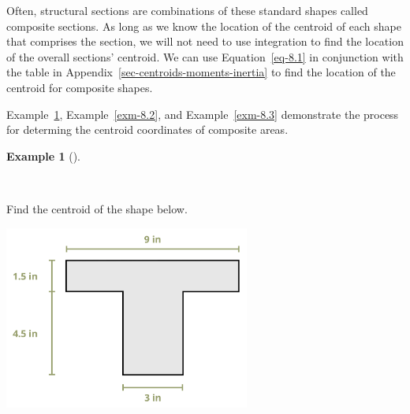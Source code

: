 \documentclass[
  letterpaper,
  DIV=11,
  numbers=noendperiod]{scrreprt}
\theoremstyle{definition}
\newtheorem{example}{Example}[chapter]
\theoremstyle{remark}
\begin{document}
Often, structural sections are combinations of these standard shapes
called composite sections. As long as we know the location of the
centroid of each shape that comprises the section, we will not need to
use integration to find the location of the overall sections' centroid.
We can use Equation~\ref{eq-8.1} in conjunction with the table in
Appendix~\ref{sec-centroids-moments-inertia} to find the location of the
centroid for composite shapes.

Example~\ref{exm-8.1}, Example~\ref{exm-8.2}, and Example~\ref{exm-8.3}
demonstrate the process for determing the centroid coordinates of
composite areas.

\begin{tcolorbox}[enhanced jigsaw, leftrule=.75mm, bottomrule=.15mm, opacityback=0, opacitybacktitle=0.6, colframe=quarto-callout-tip-color-frame, toprule=.15mm, colbacktitle=quarto-callout-tip-color!10!white, coltitle=black, bottomtitle=1mm, title={Example 8.1}, titlerule=0mm, toptitle=1mm, colback=white, rightrule=.15mm, left=2mm, arc=.35mm, breakable]

\begin{example}[]\protect\hypertarget{exm-8.1}{}\label{exm-8.1}

~

Find the centroid of the shape below.

\begin{center}
\includegraphics[width=3.17708in,height=\textheight]{images/CH 8 PNGs/example 8.1 part 1.png}
\end{center}

\begin{tcolorbox}[enhanced jigsaw, leftrule=.75mm, bottomrule=.15mm, opacityback=0, opacitybacktitle=0.6, colframe=quarto-callout-tip-color-frame, toprule=.15mm, colbacktitle=quarto-callout-tip-color!10!white, coltitle=black, bottomtitle=1mm, title={Solution}, titlerule=0mm, toptitle=1mm, colback=white, rightrule=.15mm, left=2mm, arc=.35mm, breakable]


\end{tcolorbox}
\end{example}
\end{tcolorbox}
\end{document}
